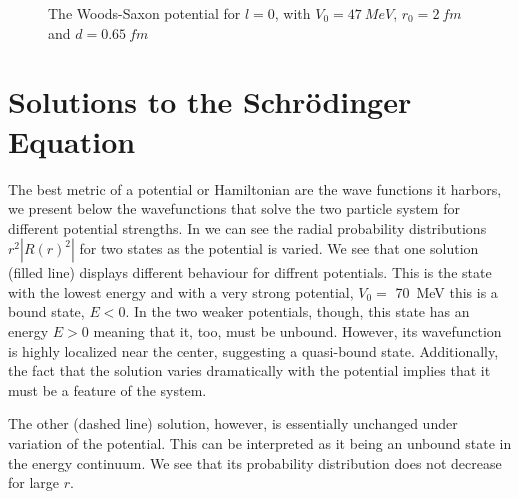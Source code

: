 \documentclass[../main/report.tex]{subfiles}
\begin{document}
\begin{figure}
  \centering
  \caption{The Woods-Saxon potential for $l = 0$, with $V_0 = \SI{47}{MeV}$, $r_0 = \SI{2}{fm}$ and $d = \SI{0.65}{fm}$}
  \label{fig:woods-saxons}
\end{figure}

\section{Solutions to the Schrödinger Equation}

The best metric of a potential or Hamiltonian are the wave functions it harbors, we present below the wavefunctions that solve the two particle system for different potential strengths.
In  we can see the radial probability distributions $r^2|R(r)^2|$ for two states as the potential is varied.
 We see that one solution (filled line) displays different behaviour for diffrent potentials.
 This is the state with the lowest energy and with a very strong potential, $V_0 =$ \SI{70}{MeV} this is a bound state, $E<0$. 
In the two weaker potentials, though, this state has an energy $E>0$ meaning that it, too, must be unbound. 
However, its wavefunction is highly localized near the center, suggesting a quasi-bound state. 
Additionally, the fact that the solution varies dramatically with the potential implies that it must be a feature of the system.
 
The other (dashed line) solution, however, is essentially unchanged under variation of the potential. 
This can be interpreted as it being an unbound state in the energy continuum. We see that its probability distribution does not decrease for large $r$.


\end{document}
